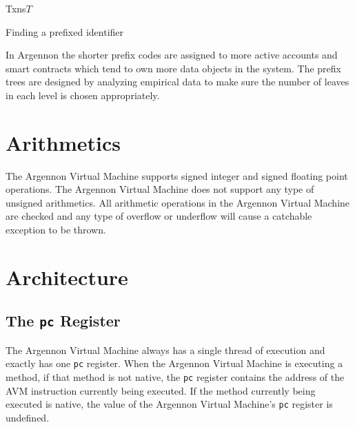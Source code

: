 \begin{algorithm}
    \DontPrintSemicolon
    \SetKwData
    {Txns}{$T$}
    \BlankLine
    {
        {
            \;
        }
    }
    \;
    \caption{Finding a prefixed identifier}\label{alg:prefix_id}
\end{algorithm}

In Argennon the shorter prefix codes are assigned to more active accounts and smart contracts which tend to own more
data objects in the system. The prefix trees are designed by analyzing empirical data to make sure the number
of leaves in each level is chosen appropriately.


\section{Arithmetics}\label{sec:arithmetics}

The Argennon Virtual Machine supports signed integer and signed floating point operations. The Argennon Virtual
Machine does not support any type of unsigned arithmetics. All arithmetic operations in the Argennon Virtual Machine
are checked and any type of overflow or underflow will cause a catchable exception to be thrown.

\section{Architecture}\label{sec:arch}


\subsection{The \texttt{pc} Register}\label{subsec:the-pc-register}

The Argennon Virtual Machine always has a single thread of execution and exactly has one \texttt{pc} register.
When the Argennon Virtual Machine is executing a method, if that method is not native, the \texttt{pc} register
contains the address of the AVM instruction currently being executed. If the method currently being executed
is native, the value of the Argennon Virtual Machine's \texttt{pc} register is undefined.

